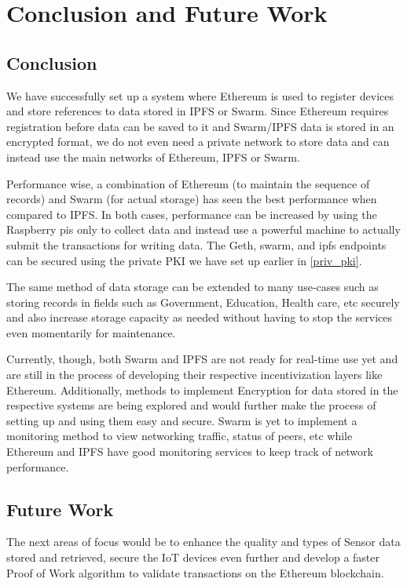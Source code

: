 \documentclass[11pt,openright]{report}
\begin{document}
\chapter{Conclusion and Future Work} \label{chapter:conclusion}
\section{Conclusion}
We have successfully set up a system where Ethereum is used to register devices and store references to data stored in IPFS or Swarm. Since Ethereum requires registration before data can be saved to it and Swarm/IPFS data is stored in an encrypted format, we do not even need a private network to store data and can instead use the main networks of Ethereum, IPFS or Swarm.

Performance wise, a combination of Ethereum (to maintain the sequence of records) and Swarm (for actual storage) has seen the best performance when compared to IPFS. In both cases, performance can be increased by using the Raspberry pis only to collect data and instead use a powerful machine to actually submit the transactions for writing data. The Geth, swarm, and ipfs endpoints can be secured using the private PKI we have set up earlier in \ref{priv_pki}.

The same method of data storage can be extended to many use-cases such as storing records in fields such as Government, Education, Health care, etc securely and also increase storage capacity as needed without having to stop the services even momentarily for maintenance.

Currently, though, both Swarm and IPFS are not ready for real-time use yet and are still in the process of developing their respective incentivization layers \cite{ethersphere2016sw3} like Ethereum. Additionally, methods to implement Encryption for data stored in the respective systems are being explored and would further make the process of setting up and using them easy and secure. Swarm is yet to implement a monitoring method to view networking traffic, status of peers, etc while Ethereum and IPFS have good monitoring services to keep track of network performance.

\section{Future Work}
The next areas of focus would be to enhance the quality and types of Sensor data stored and retrieved, secure the IoT devices even further and develop a faster Proof of Work algorithm to validate transactions on the Ethereum blockchain. 
\end{document}
